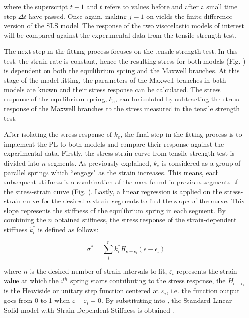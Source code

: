 \noindent where the superscript $t-1$ and $t$ refers to values before and after a small time step $\Delta t$ have passed. Once again, making $j=1$ on  yields the finite difference version of the SLS model. The response of the two viscoelastic models of interest will be compared against the experimental data from the tensile strength test.

The next step in the fitting process focuses on the tensile strength test. In this test, the strain rate is constant, hence the resulting stress for both models (Fig. ) is dependent on both the equilibrium spring and the Maxwell branches. At this stage of the model fitting, the parameters of the Maxwell branches in both models are known and their stress response can be calculated. The stress response of the equilibrium spring, $k_e$, can be isolated by subtracting the stress response of the Maxwell branches to the stress measured in the tensile strength test. 

After isolating the stress response of $k_e$, the final step in the fitting process is to implement the PL to both models and compare their response against the experimental data. Firstly, the stress-strain curve from tensile strength test is divided into $n$ segments. As previously explained, $k_e$ is considered as a group of parallel springs which ``engage" as the strain increases. This means, each subsequent stiffness is a combination of the ones found in previous segments of the stress-strain curve (Fig. ).  Lastly, a linear regression is applied on the stress-strain curve for the desired $n$ strain segments to find the slope of the curve. This slope represents the stiffness of the equilibrium spring in each segment. By combining the $n$ obtained stiffness, the stress response of the strain-dependent stiffness $k_i^*$ is defined as follows:

\begin{equation}
\label{eq5}
\sigma^* = \sum_i^n k_i^* H_{\epsilon - \epsilon_i}(\epsilon - \epsilon_i)
\end{equation}

\noindent where $n$ is the desired number of strain intervals to fit, $\varepsilon_i$ represents the strain value at which the $i^{th}$ spring starts contributing to the stress response, the $H_{\epsilon - \epsilon_i}$ is the Heaviside or unitary step function centered at $\varepsilon_i$, i.e. the function output goes from 0 to 1 when $\varepsilon - \varepsilon_i = 0$. By substituting  into , the Standard Linear Solid model with Strain-Dependent Stiffness is obtained \cite{austin2015control}.

